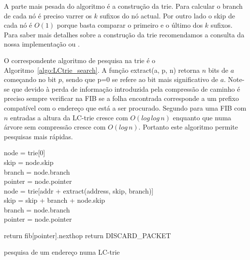 \documentclass[10pt,a4paper]{article}
\begin{document}
A parte mais pesada do algoritmo é a construção da trie. Para calcular o branch de cada nó é preciso varrer os $k$ sufixos do nó actual. Por outro lado o skip de cada nó é $O(1)$ porque basta comparar o primeiro e o último dos $k$ sufixos. Para saber mais detalhes sobre a construção da trie recomendamos a consulta da nossa implementação ou \cite{SNilsson99}.

O correspondente algoritmo de pesquisa na trie é o Algoritmo~\ref{algo:LCtrie_search}. A função extract(a, p, n) retorna $n$ bits de $a$ começando no bit $p$, sendo que p=0 se refere ao bit mais significativo de $a$. Note-se que devido à perda de informação introduzida pela compressão de caminho é preciso sempre verificar na FIB se a folha encontrada corresponde a um prefixo compatível com o endereço que está a ser procurado. Segundo \cite{SNilsson99} para uma FIB com $n$ entradas a altura da \mbox{LC-trie} cresce com $O(log \, log \, n)$ enquanto que numa árvore sem compressão cresce com $O(log \, n)$. Portanto este algoritmo permite pesquisas mais rápidas.

\begin{algorithm}
	\label{algo:LCtrie_search}

	node = trie[0] \\
	skip = node.skip \\
	branch = node.branch \\
	pointer = node.pointer \\
	{
		node = trie[addr + extract(address, skip, branch)] \\
		skip = skip + branch + node.skip \\
		branch = node.branch \\
		pointer = node.pointer \\
	}
	
	{
		return fib[pointer].nexthop
	}
	\Else
	{
		return DISCARD\_PACKET
	}
		\begin{comment}
			node = trie[0]
			skip = node.skip
			branch = node.branch
			pointer = node.pointer
			
			while( branch != 0 )
			{
				node = trie[addr + extract(address, skip, branch)]
				skip = skip + branch + node.skip
				branch = node.branch
				pointer = node.pointer
			}
			
			if( address starts with fib[pointer].prefix )
				return fib[pointer].nexthop
			else
				return DISCARD_PACKET \\
		\end{comment}
	\caption{pesquisa de um endereço numa LC-trie}
\end{algorithm}
\end{document}

